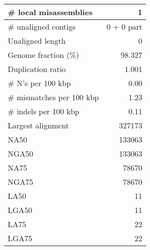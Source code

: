 \documentclass[12pt,a4paper]{article}
\begin{document}
\begin{table}[ht]
\begin{center}
\begin{tabular}{|l*{1}{|r}|}
\# local misassemblies & 1 \\ \hline
\# unaligned contigs & 0 + 0 part \\ \hline
Unaligned length & 0 \\ \hline
Genome fraction (\%) & 98.327 \\ \hline
Duplication ratio & 1.001 \\ \hline
\# N's per 100 kbp & 0.00 \\ \hline
\# mismatches per 100 kbp & 1.23 \\ \hline
\# indels per 100 kbp & 0.11 \\ \hline
Largest alignment & 327173 \\ \hline
NA50 & 133063 \\ \hline
NGA50 & 133063 \\ \hline
NA75 & 78670 \\ \hline
NGA75 & 78670 \\ \hline
LA50 & 11 \\ \hline
LGA50 & 11 \\ \hline
LA75 & 22 \\ \hline
LGA75 & 22 \\ \hline
\end{tabular}
\end{center}
\end{table}
\end{document}
